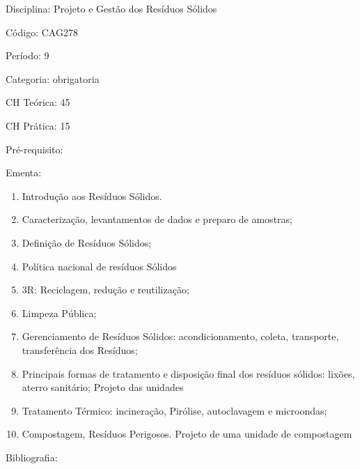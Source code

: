 \documentclass[12pt,a4paper,twoside]{report}
\begin{document}
Disciplina: Projeto e Gestão dos Resíduos Sólidos

Código: CAG278

Período: 9

Categoria: obrigatoria

CH Teórica: 45

CH Prática: 15




Pré-requisito:
\begin{enumerate}
\end{enumerate}

Ementa:
\begin{enumerate}
\item Introdução aos Resíduos Sólidos.
\item Caracterização, levantamentos de dados e preparo de amostras;
\item Definição de Resíduos Sólidos;
\item Política nacional de resíduos Sólidos
\item 3R: Reciclagem, redução e reutilização;
\item Limpeza Pública;
\item Gerenciamento de Resíduos Sólidos: acondicionamento, coleta, transporte, transferência dos Resíduos;
\item Principais formas de tratamento e disposição final dos resíduos sólidos: lixões, aterro sanitário; Projeto das unidades
\item Tratamento Térmico: incineração, Pirólise, autoclavagem e microondas;
\item Compostagem, Resíduos Perigosos. Projeto de uma unidade de compostagem
\end{enumerate}



Bibliografia:
\end{document}
